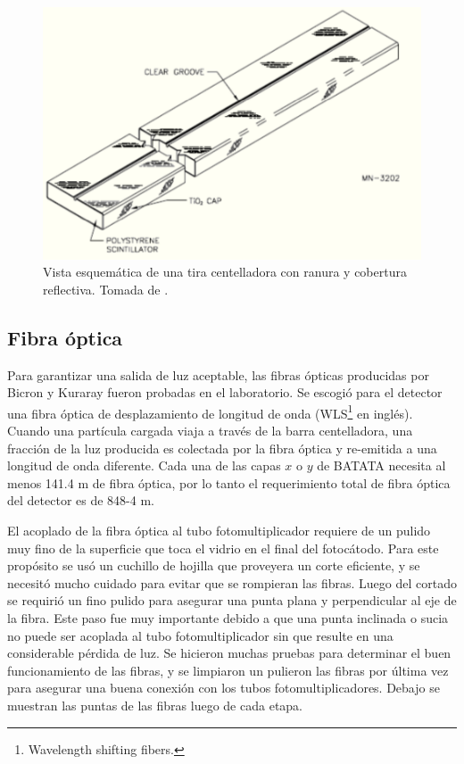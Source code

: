 \documentclass[a4paper,10pt]{article}
\numberwithin{equation}{section}
\begin{document}
\begin{figure}[H]
 \center 
 \includegraphics[scale=0.5]{fig3}
 \caption{Vista esquemática de una tira centelladora con ranura y cobertura 
 reflectiva. Tomada de \cite{trovato}.}
\end{figure}

\subsection{Fibra óptica}

Para garantizar una salida de luz aceptable, las fibras ópticas producidas por 
Bicron y Kuraray fueron probadas en el laboratorio. Se escogió para el detector 
una fibra óptica de desplazamiento de longitud de onda (WLS\footnote{Wavelength 
shifting fibers.} en inglés). Cuando una partícula cargada viaja a través de la 
barra centelladora, una fracción de la luz producida es colectada por la fibra 
óptica y re-emitida a una longitud de onda diferente. Cada una de las capas $x$ 
o $y$ de BATATA necesita al menos 141.4 m de fibra óptica, por lo tanto el requerimiento 
total de fibra óptica del detector es de 848-4 m.

\vspace{.3cm}

El acoplado de la fibra óptica al tubo fotomultiplicador requiere de un pulido 
muy fino de la superficie que toca el vidrio en el final del fotocátodo. Para este 
propósito se usó un cuchillo de hojilla que proveyera un corte eficiente, y se necesitó 
mucho cuidado para evitar que se rompieran las fibras. Luego del cortado se 
requirió un fino pulido para asegurar una punta plana y perpendicular al eje de 
la fibra. Este paso fue muy importante debido a que una punta inclinada o sucia 
no puede ser acoplada al tubo fotomultiplicador sin que resulte en una considerable 
pérdida de luz. Se hicieron muchas pruebas para determinar el buen funcionamiento de 
las fibras, y se limpiaron un pulieron las fibras por última vez para asegurar una 
buena conexión con los tubos fotomultiplicadores. Debajo se muestran las puntas de 
las fibras luego de cada etapa. 
\end{document}
